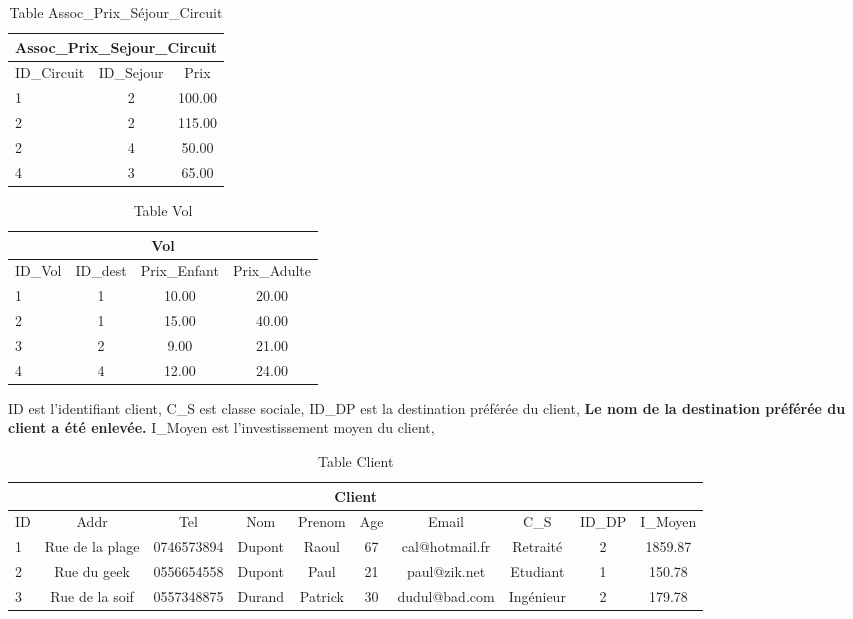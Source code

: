 \begin{table}[h]
\begin{center}
\begin{tabular}{|l|c|c|}
\hline
\multicolumn{3}{|c|}{Assoc\_Prix\_Sejour\_Circuit}\\
\hline
ID\_Circuit& ID\_Sejour & Prix\\
\hline
1 & 2& 100.00\\
\hline
2 & 2& 115.00\\
\hline
2 & 4& 50.00\\
\hline
4 & 3& 65.00\\
\hline
\end{tabular}
\end{center}
\caption{Table Assoc\_Prix\_S\'ejour\_Circuit}
\end{table}
\newpage

\begin{table}[h]
\begin{center}
\begin{tabular}{|l|c|c|c|}
\hline
\multicolumn{4}{|c|}{Vol}\\
\hline
ID\_Vol& ID\_dest & Prix\_Enfant& Prix\_Adulte\\
\hline
1 & 1& 10.00 & 20.00\\
\hline
2 & 1& 15.00& 40.00\\
\hline
3 & 2& 9.00& 21.00\\
\hline
4 & 4& 12.00& 24.00\\
\hline
\end{tabular}
\end{center}
\caption{Table Vol}
\end{table}


\begin{table}[h]
ID est l'identifiant client,
C\_S est classe sociale,
ID\_DP est la destination pr\'ef\'er\'ee du client,
\textbf{Le nom de la destination pr\'ef\'er\'ee du client a \'et\'e enlev\'ee.}
I\_Moyen est l'investissement moyen du client,
\bigskip

\begin{tabular}{|l|c|c|c|c|c|c|c|c|c|}
\hline
\multicolumn{10}{|c|}{Client}\\
\hline
ID& Addr& Tel & Nom & Prenom & Age & Email&C\_S & ID\_DP &I\_Moyen\\
\hline
1 &Rue de la plage&0746573894&Dupont&Raoul&67 &cal@hotmail.fr&Retrait\'e&2&1859.87\\
\hline
2 &Rue du geek&0556654558&Dupont&Paul&21 &paul@zik.net&Etudiant&1&150.78\\
\hline
3 &Rue de la soif&0557348875&Durand&Patrick&30 &dudul@bad.com&Ing\'enieur&2&179.78\\
\hline
\end{tabular}
\caption{Table Client}
\end{table}

